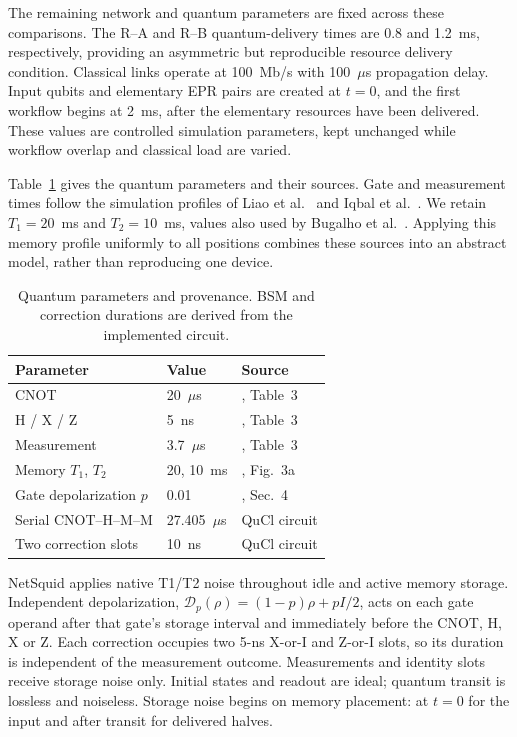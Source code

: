 The remaining network and quantum parameters are fixed across these
comparisons. The R--A and R--B quantum-delivery times are 0.8 and
1.2~ms, respectively, providing an asymmetric but reproducible resource
delivery condition. Classical links operate at 100~Mb/s with
100~$\mu$s propagation delay. Input qubits and elementary EPR pairs are
created at $t=0$, and the first workflow begins at 2~ms, after the
elementary resources have been delivered. These values are controlled
simulation parameters, kept unchanged while workflow overlap and
classical load are varied.

Table~\ref{tab:qucl-physical-profile} gives the quantum parameters and
their sources. Gate and measurement times follow the simulation profiles
of Liao et al.~\cite{liao2022benchmarking} and Iqbal et
al.~\cite{iqbal2023cloning}. We retain $T_1=20$~ms and $T_2=10$~ms,
values also used by Bugalho et al.~\cite{bugalho2023resource}.
Applying this memory profile uniformly to all positions combines these
sources into an abstract model, rather than reproducing one device.

\begin{table}[t]
\centering
\caption{Quantum parameters and provenance. BSM and correction durations
are derived from the implemented circuit.}
\label{tab:qucl-physical-profile}
\small
\begin{tabular}{@{}lll@{}}
\toprule
Parameter & Value & Source \\
\midrule
CNOT & 20~$\mu$s & \cite{liao2022benchmarking,iqbal2023cloning}, Table~3 \\
H / X / Z & 5~ns & \cite{liao2022benchmarking,iqbal2023cloning}, Table~3 \\
Measurement & 3.7~$\mu$s & \cite{liao2022benchmarking,iqbal2023cloning}, Table~3 \\
Memory $T_1$, $T_2$ & 20, 10~ms & \cite{bugalho2023resource}, Fig.~3a \\
Gate depolarization $p$ & 0.01 & \cite{iqbal2023cloning}, Sec.~4 \\
\midrule
Serial CNOT--H--M--M & 27.405~$\mu$s & QuCl circuit \\
Two correction slots & 10~ns & QuCl circuit \\
\bottomrule
\end{tabular}
\end{table}

NetSquid applies native T1/T2 noise throughout idle and active memory
storage. Independent depolarization,
$\mathcal D_p(\rho)=(1-p)\rho+pI/2$, acts on each gate operand after
that gate's storage interval and immediately before the CNOT, H, X or Z.
Each correction occupies two 5-ns X-or-I and Z-or-I slots, so its duration
is independent of the measurement outcome. Measurements and identity
slots receive storage noise only. Initial states and readout are ideal;
quantum transit is lossless and noiseless. Storage noise begins on memory
placement: at $t=0$ for the input and after transit for delivered halves.

